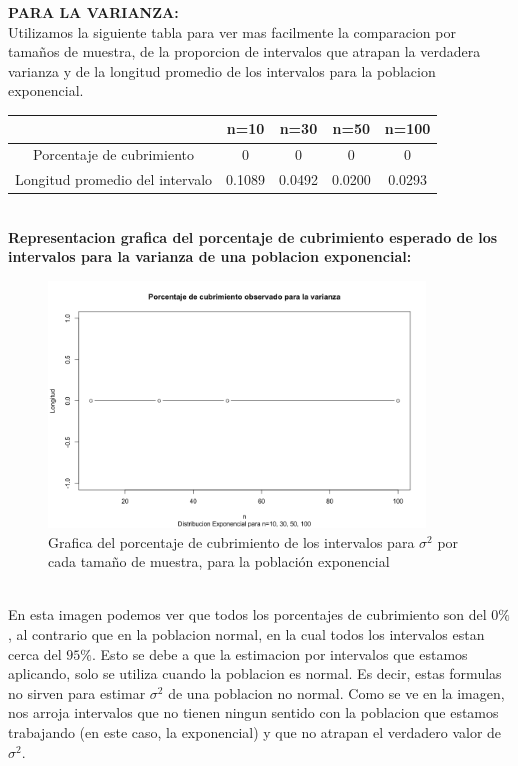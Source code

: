 \documentclass[letterpaper,12pt,onecolumn,titlepage]{article}
\begin{document}
\pagebreak\textbf{PARA LA VARIANZA:}
~\\ Utilizamos la siguiente tabla para ver mas facilmente la comparacion por tama\~{n}os de muestra, de la proporcion de intervalos que atrapan la verdadera varianza y de la longitud promedio de los intervalos para la poblacion exponencial.
\begin{center}
\begin{tabular}{|c|c|c|c|c|}
\hline 
\rule[-1ex]{0pt}{2.5ex}  & n=10 & n=30 & n=50 & n=100 \\ 
\hline 
\rule[-1ex]{0pt}{2.5ex} Porcentaje de cubrimiento & 0 & 0 & 0 & 0 \\ 
\hline 
\rule[-1ex]{0pt}{2.5ex} Longitud promedio del intervalo & 0.1089 & 0.0492 & 0.0200 & 0.0293 \\ 
\hline 
\end{tabular} 
\end{center}
~\\\textbf{Representacion grafica del porcentaje de cubrimiento esperado de los intervalos para la varianza de una poblacion exponencial:}
~\\ \begin{figure}[!h]
    \begin{center}
        \includegraphics[width=10cm]{Figuras/Pc2.png}
        \caption{Grafica del porcentaje de cubrimiento de los intervalos para $\sigma^2$ por cada tama\~{n}o de muestra, para la poblaci\'{o}n exponencial}
        \label{fig:Densidad}
    \end{center}
\end{figure}
~\\ En esta imagen podemos ver que todos los porcentajes de cubrimiento son del $0\%$, al contrario que en la poblacion normal, en la cual todos los intervalos estan cerca del $95\%$. Esto se debe a que la estimacion por intervalos que estamos aplicando, solo se utiliza cuando la poblacion es normal. Es decir, estas formulas no sirven para estimar $\sigma^2$ de una poblacion no normal. Como se ve en la imagen, nos arroja intervalos que no tienen ningun sentido con la poblacion que estamos trabajando (en este caso, la exponencial) y que no atrapan el verdadero valor de $\sigma^2$.
\end{document}
